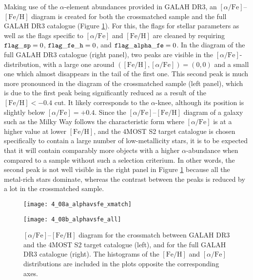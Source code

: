 \documentclass[a4paper,11pt]{article}
\begin{document}
Making use of the $\alpha$-element abundances provided in GALAH DR3, an $[\alpha/\mathrm{Fe}]$--$\mathrm{[Fe/H]}$ diagram is created for both the crossmatched sample and the full GALAH DR3 catalogue (Figure \ref{fig:alphafe_galah}). For this, the flags for stellar parameters as well as the flags specific to $[\alpha/\mathrm{Fe}]$ and $\mathrm{[Fe/H]}$ are cleaned by requiring $\mathrm{{\tt flag\_sp}}=0$, $\mathrm{{\tt flag\_fe\_h}}=0$, and $\mathrm{{\tt flag\_alpha\_fe}}=0$. In the diagram of the full GALAH DR3 catalogue (right panel), two peaks are visible in the $[\alpha/\mathrm{Fe}]$-distribution, with a large one around $(\mathrm{[Fe/H]},[\alpha/\mathrm{Fe}])=(0,0)$ and a small one which almost disappears in the tail of the first one. This second peak is much more pronounced in the diagram of the crossmatched sample (left panel), which is due to the first peak being significantly reduced as a result of the $\mathrm{[Fe/H]}<-0.4$ cut. It likely corresponds to the $\alpha$-knee, although its position is slightly below $[\alpha/\mathrm{Fe}]=+0.4$. Since the $[\alpha/\mathrm{Fe}]$--$\mathrm{[Fe/H]}$ diagram of a galaxy such as the Milky Way follows the characteristic form where $[\alpha/\mathrm{Fe}]$ is at a higher value at lower $\mathrm{[Fe/H]}$, and the 4MOST S2 target catalogue is chosen specifically to contain a large number of low-metallicity stars, it is to be expected that it will contain comparably more objects with a higher $\alpha$-abundance when compared to a sample without such a selection criterium. In other words, the second peak is not well visible in the right panel in Figure \ref{fig:alphafe_galah} because all the metal-rich stars dominate, whereas the contrast between the peaks is reduced by a lot in the crossmatched sample.
%
\begin{figure}
 \centering
 \begin{minipage}[t]{0.5\textwidth}
  \centering
  \texttt{[image: 4\_08a\_alphavsfe\_xmatch]}
 \end{minipage}\hfill
 \begin{minipage}[t]{0.5\textwidth}
  \centering
  \texttt{[image: 4\_08b\_alphavsfe\_all]}
 \end{minipage}
 \caption[$\alpha$ vs. iron abundance diagrams for GALAH and crossmatch]{$[\alpha/\mathrm{Fe}]$--$\mathrm{[Fe/H]}$ diagram for the crossmatch between GALAH DR3 and the 4MOST S2 target catalogue (left), and for the full GALAH DR3 catalogue (right). The histograms of the $\mathrm{[Fe/H]}$ and $[\alpha/\mathrm{Fe}]$ distributions are included in the plots opposite the corresponding axes.}
 \label{fig:alphafe_galah}
\end{figure}\\ \\
\end{document}
